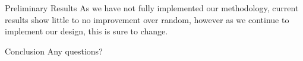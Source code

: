 \begin{frame}{Preliminary Results}
    As we have not fully implemented our methodology, current results show
    little to no improvement over random, however as we continue to implement our design,
    this is sure to change.
\end{frame}

\begin{frame}{Conclusion}
    Any questions?
\end{frame}

